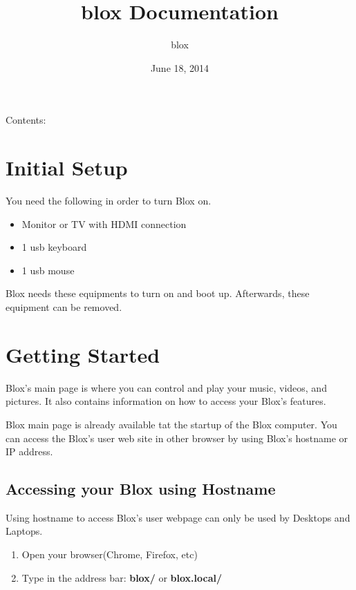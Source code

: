 \documentclass[letterpaper,10pt,english]{sphinxmanual}
\title{blox Documentation}
\date{June 18, 2014}
\author{blox}
\begin{document}
\maketitle
\tableofcontents
{}\label{index::doc}


Contents:


\chapter{Initial Setup}
\label{initial:initial}\label{initial:welcome-to-blox-s-user-guide}\label{initial::doc}\label{initial:initial-setup}
You need the following in order to turn Blox on.
\begin{itemize}
\item {} 
Monitor or TV with HDMI connection

\item {} 
1 usb keyboard

\item {} 
1 usb mouse

\end{itemize}

Blox needs these equipments to turn on and boot up. Afterwards, these equipment can be removed.


\chapter{Getting Started}
\label{gettingstarted:gettingstarted}\label{gettingstarted:getting-started}\label{gettingstarted::doc}
Blox's main page is where you can control and play your music, videos, and pictures. It also contains information on how to access your Blox's features.

Blox main page is already available tat the startup of the Blox computer. You can access the Blox's user web site in other browser by using Blox's hostname or IP address.


\section{Accessing your Blox using Hostname}
\label{gettingstarted:accessing-your-blox-using-hostname}\label{gettingstarted:id1}
Using hostname to access Blox's user webpage can only be used by Desktops and Laptops.
\begin{enumerate}
\item {} 
Open your browser(Chrome, Firefox, etc)

\item {} 
Type in the address bar: \textbf{blox/} or \textbf{blox.local/}

\end{enumerate}
\end{document}
